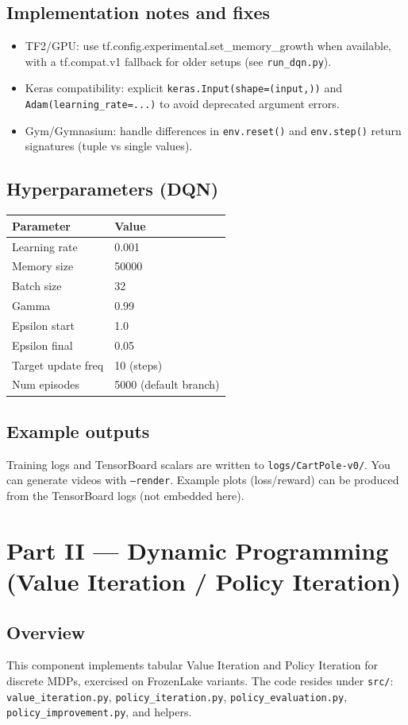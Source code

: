 \documentclass[11pt]{article}
\begin{document}
\subsection{Implementation notes and fixes}
\begin{itemize}
  \item TF2/GPU: use tf.config.experimental.set\_memory\_growth when available,
    with a tf.compat.v1 fallback for older setups (see \texttt{run\_dqn.py}).
  \item Keras compatibility: explicit \texttt{keras.Input(shape=(input,))} and
    \texttt{Adam(learning\_rate=...)} to avoid deprecated argument errors.
  \item Gym/Gymnasium: handle differences in \texttt{env.reset()} and
    \texttt{env.step()} return signatures (tuple vs single values).
\end{itemize}

\subsection{Hyperparameters (DQN)}
\begin{tabular}{ll}
\toprule
Parameter & Value \\
\midrule
Learning rate & 0.001 \\
Memory size & 50000 \\
Batch size & 32 \\
Gamma & 0.99 \\
Epsilon start & 1.0 \\
Epsilon final & 0.05 \\
Target update freq & 10 (steps) \\
Num episodes & 5000 (default branch) \\
\bottomrule
\end{tabular}

\subsection{Example outputs}
Training logs and TensorBoard scalars are written to \texttt{logs/CartPole-v0/}.
You can generate videos with \texttt{--render}. Example plots (loss/reward)
can be produced from the TensorBoard logs (not embedded here).

\section{Part II — Dynamic Programming (Value Iteration / Policy Iteration)}
\subsection{Overview}
This component implements tabular Value Iteration and Policy Iteration for
discrete MDPs, exercised on FrozenLake variants. The code resides under
\texttt{src/}: \texttt{value\_iteration.py}, \texttt{policy\_iteration.py},
\texttt{policy\_evaluation.py}, \texttt{policy\_improvement.py}, and helpers.
\end{document}
